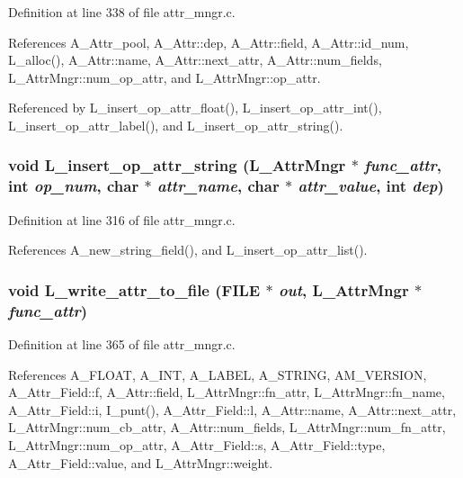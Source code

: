 Definition at line 338 of file attr\_\-mngr.c.

References A\_\-Attr\_\-pool, A\_\-Attr::dep, A\_\-Attr::field, A\_\-Attr::id\_\-num, L\_\-alloc(), A\_\-Attr::name, A\_\-Attr::next\_\-attr, A\_\-Attr::num\_\-fields, L\_\-Attr\-Mngr::num\_\-op\_\-attr, and L\_\-Attr\-Mngr::op\_\-attr.

Referenced by L\_\-insert\_\-op\_\-attr\_\-float(), L\_\-insert\_\-op\_\-attr\_\-int(), L\_\-insert\_\-op\_\-attr\_\-label(), and L\_\-insert\_\-op\_\-attr\_\-string().
\subsubsection{\setlength{\rightskip}{0pt plus 5cm}void L\_\-insert\_\-op\_\-attr\_\-string (\bf{L\_\-Attr\-Mngr} $\ast$ {\em func\_\-attr}, int {\em op\_\-num}, char $\ast$ {\em attr\_\-name}, char $\ast$ {\em attr\_\-value}, int {\em dep})}\label{attr__mngr_8c_34378ebaa293e73bad598ca574961a7f}




Definition at line 316 of file attr\_\-mngr.c.

References A\_\-new\_\-string\_\-field(), and L\_\-insert\_\-op\_\-attr\_\-list().
\subsubsection{\setlength{\rightskip}{0pt plus 5cm}void L\_\-write\_\-attr\_\-to\_\-file (FILE $\ast$ {\em out}, \bf{L\_\-Attr\-Mngr} $\ast$ {\em func\_\-attr})}\label{attr__mngr_8c_409c52cce03186e40f14eceb77f5bf52}




Definition at line 365 of file attr\_\-mngr.c.

References A\_\-FLOAT, A\_\-INT, A\_\-LABEL, A\_\-STRING, AM\_\-VERSION, A\_\-Attr\_\-Field::f, A\_\-Attr::field, L\_\-Attr\-Mngr::fn\_\-attr, L\_\-Attr\-Mngr::fn\_\-name, A\_\-Attr\_\-Field::i, I\_\-punt(), A\_\-Attr\_\-Field::l, A\_\-Attr::name, A\_\-Attr::next\_\-attr, L\_\-Attr\-Mngr::num\_\-cb\_\-attr, A\_\-Attr::num\_\-fields, L\_\-Attr\-Mngr::num\_\-fn\_\-attr, L\_\-Attr\-Mngr::num\_\-op\_\-attr, A\_\-Attr\_\-Field::s, A\_\-Attr\_\-Field::type, A\_\-Attr\_\-Field::value, and L\_\-Attr\-Mngr::weight.

